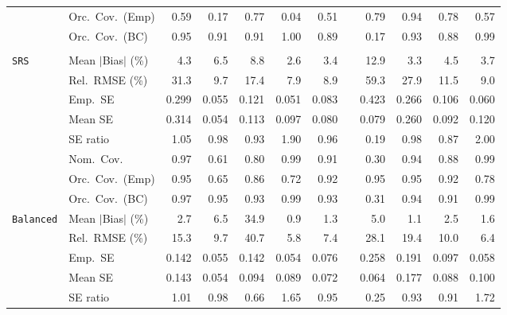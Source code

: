 \begin{landscape}
\begin{longtable}{llrrrrrrrrrr}
 & Orc.\ Cov.\ (Emp) & 0.59 & 0.17 & 0.77 & 0.04 & 0.51 &  & \cellcolor{ranktwo}0.79 & \cellcolor{rankone}0.94 & \cellcolor{rankthree}0.78 & 0.57 \\
 & Orc.\ Cov.\ (BC) & \cellcolor{rankone}0.95 & \cellcolor{rankthree}0.91 & 0.91 & 1.00 & 0.89 &  & 0.17 & \cellcolor{ranktwo}0.93 & 0.88 & 0.99 \\
\addlinespace[2pt]
\multicolumn{12}{l}{\textbf{Binary \& Categorical Phase-Two Covariates}} \\
\addlinespace[2pt]
\quad \texttt{SRS} & Mean $|$Bias$|$ (\%) & 4.3 & 6.5 & 8.8 & \cellcolor{rankone}2.6 & \cellcolor{rankthree}3.4 &  & 12.9 & \cellcolor{ranktwo}3.3 & 4.5 & 3.7 \\
 & Rel.\ RMSE (\%) & 31.3 & 9.7 & 17.4 & \cellcolor{rankone}7.9 & \cellcolor{ranktwo}8.9 &  & 59.3 & 27.9 & 11.5 & \cellcolor{rankthree}9.0 \\
 & Emp.\ SE & 0.299 & 0.055 & 0.121 & 0.051 & 0.083 &  & 0.423 & 0.266 & 0.106 & 0.060 \\
 & Mean SE & 0.314 & 0.054 & 0.113 & 0.097 & 0.080 &  & 0.079 & 0.260 & 0.092 & 0.120 \\
 & SE ratio & 1.05 & \cellcolor{rankone}0.98 & 0.93 & 1.90 & \cellcolor{rankthree}0.96 &  & 0.19 & \cellcolor{ranktwo}0.98 & 0.87 & 2.00 \\
 & Nom.\ Cov. & \cellcolor{ranktwo}0.97 & 0.61 & 0.80 & 0.99 & 0.91 &  & 0.30 & \cellcolor{rankone}0.94 & 0.88 & \cellcolor{rankthree}0.99 \\
 & Orc.\ Cov.\ (Emp) & \cellcolor{rankthree}0.95 & 0.65 & 0.86 & 0.72 & 0.92 &  & \cellcolor{rankone}0.95 & \cellcolor{ranktwo}0.95 & 0.92 & 0.78 \\
 & Orc.\ Cov.\ (BC) & \cellcolor{rankthree}0.97 & \cellcolor{rankone}0.95 & 0.93 & 0.99 & 0.93 &  & 0.31 & \cellcolor{ranktwo}0.94 & 0.91 & 0.99 \\
\addlinespace[2pt]
\quad \texttt{Balanced} & Mean $|$Bias$|$ (\%) & 2.7 & 6.5 & 34.9 & \cellcolor{rankone}0.9 & \cellcolor{rankthree}1.3 &  & 5.0 & \cellcolor{ranktwo}1.1 & 2.5 & 1.6 \\
 & Rel.\ RMSE (\%) & 15.3 & 9.7 & 40.7 & \cellcolor{rankone}5.8 & \cellcolor{rankthree}7.4 &  & 28.1 & 19.4 & 10.0 & \cellcolor{ranktwo}6.4 \\
 & Emp.\ SE & 0.142 & 0.055 & 0.142 & 0.054 & 0.076 &  & 0.258 & 0.191 & 0.097 & 0.058 \\
 & Mean SE & 0.143 & 0.054 & 0.094 & 0.089 & 0.072 &  & 0.064 & 0.177 & 0.088 & 0.100 \\
 & SE ratio & \cellcolor{rankone}1.01 & \cellcolor{ranktwo}0.98 & 0.66 & 1.65 & \cellcolor{rankthree}0.95 &  & 0.25 & 0.93 & 0.91 & 1.72 \\

\end{longtable}
\end{landscape}
